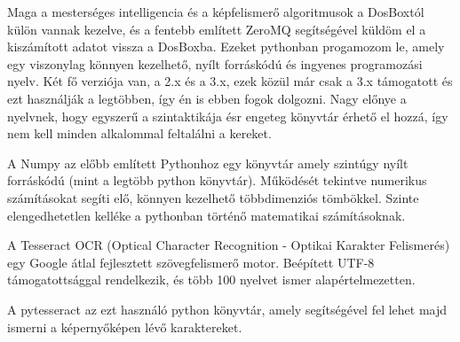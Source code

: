 
Maga a mesterséges intelligencia és a képfelismerő algoritmusok a DosBoxtól külön vannak kezelve, és a fentebb említett ZeroMQ segítségével küldöm el a kiszámított adatot vissza a DosBoxba. Ezeket pythonban progamozom le, amely egy viszonylag könnyen kezelhető, nyílt forráskódú és ingyenes programozási nyelv. Két fő verziója van, a 2.x és a 3.x, ezek közül már csak a 3.x támogatott és ezt használják a legtöbben, így én is ebben fogok dolgozni. Nagy előnye a nyelvnek, hogy egyszerű a szintaktikája ésr engeteg könyvtár érhető el hozzá, így nem kell minden alkalommal feltalálni a kereket.



A Numpy az előbb említett Pythonhoz egy könyvtár amely szintúgy nyílt forráskódú (mint a legtöbb python könyvtár). Működését tekintve numerikus számításokat segíti elő, könnyen kezelhető többdimenziós tömbökkel. Szinte elengedhetetlen kelléke a pythonban történő matematikai számításoknak.


A Tesseract OCR (Optical Character Recognition - Optikai Karakter Felismerés) egy Google átlal fejlesztett szövegfelismerő motor. Beépített UTF-8 támogatottsággal rendelkezik, és több 100 nyelvet ismer alapértelmezetten.

A pytesseract az ezt használó python könyvtár, amely segítségével fel lehet majd ismerni a képernyőképen lévő karaktereket.


